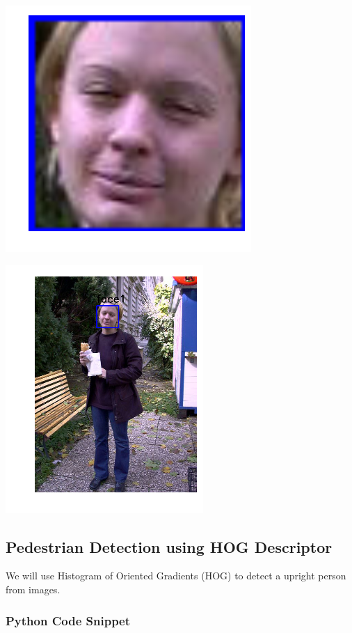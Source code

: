 \includegraphics{facedetection_files/facedetection_59_9.png}

\includegraphics{facedetection_files/facedetection_59_10.png}

\subsection{Pedestrian Detection using HOG
Descriptor}\label{pedestrian-detection-using-hog-descriptor}

We will use Histogram of Oriented Gradients (HOG) to detect a upright
person from images.

\subsubsection{Python Code Snippet}\label{python-code-snippet}

